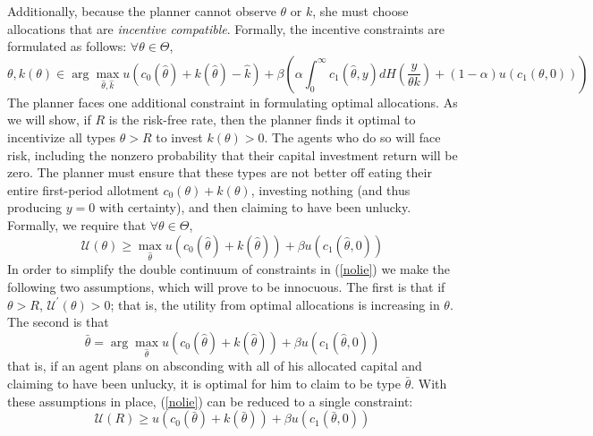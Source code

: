 \documentclass[11pt]{article}
\newcommand{\p}{\prime}
\newcommand{\U}{\mathcal{U}}
\begin{document}
Additionally, because the planner cannot observe \( \theta \) or \( k \), she must choose allocations that are \textit{incentive compatible}. Formally, the incentive constraints are formulated as follows: \( \forall \theta\in\Theta \),
\begin{equation}
    \theta, k(\theta)\in\arg\max_{\hat{\theta},\hat{k}}u\left( c_0(\hat{\theta}) + k(\hat{\theta}) - \hat{k} \right) + \beta\left( \alpha\int_{0}^{\infty}c_1(\hat{\theta},y)dH\left( \frac{y}{\theta k} \right) + (1 - \alpha)u\left( c_1\left( \theta,0 \right) \right) \right) \label{ics}
\end{equation}
The planner faces one additional constraint in formulating optimal allocations. As we will show, if \( R \) is the risk-free rate, then the planner finds it optimal to incentivize all types \( \theta > R \) to invest \( k(\theta)>0 \). The agents who do so will face risk, including the nonzero probability that their capital investment return will be zero. The planner must ensure that these types are not better off eating their entire first-period allotment \( c_0(\theta) + k(\theta) \), investing nothing (and thus producing \( y = 0 \) with certainty), and then claiming to have been unlucky. Formally, we require that \( \forall\theta\in\Theta \),
\begin{equation}
    \U(\theta)\geq \max_{\hat{\theta}} u\left( c_0(\hat{\theta}) + k(\hat{\theta}) \right) + \beta u\left( c_1(\hat{\theta},0) \right) \label{nolie}
\end{equation}
In order to simplify the double continuum of constraints in (\ref{nolie}) we make the following two assumptions, which will prove to be innocuous. The first is that if \( \theta > R \), \( \U^\p(\theta) > 0 \); that is, the utility from optimal allocations is increasing in \( \theta \). The second is that 
\begin{equation}
    \bar{\theta} = \arg \max_{\hat{\theta}} u\left( c_0(\hat{\theta}) + k(\hat{\theta}) \right) + \beta u\left( c_1(\hat{\theta},0) \right) 
\end{equation}
that is, if an agent plans on absconding with all of his allocated capital and claiming to have been unlucky, it is optimal for him to claim to be type \( \bar{\theta} \). With these assumptions in place, (\ref{nolie}) can be reduced to a single constraint:
\begin{equation}
    \U(R)\geq u\left( c_0(\bar{\theta}) + k(\bar{\theta}) \right) + \beta u\left( c_1(\bar{\theta},0) \right) \label{nolie1}
\end{equation}




\end{document}
